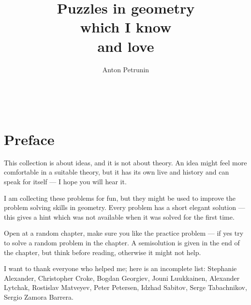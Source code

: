 \documentclass[twoside]{book}
\begin{document}
\title{Puzzles in geometry \\
which I know \\ and love}
\author{Anton Petrunin}

\date{}
\maketitle

\null\vfill{}

\ 

\thispagestyle{empty}
\thispagestyle{empty}
\tableofcontents
\thispagestyle{empty}

\newpage
\thispagestyle{empty}
\section*{Preface}

This collection is about ideas, and it is not about theory.
An idea might feel more comfortable in a suitable theory,
but it has its own live and history and can speak for itself --- I hope you will hear it.

I am collecting these problems for fun, 
but they might be used to improve 
the problem solving skills in geometry.
Every problem has a short elegant solution ---
this gives a hint which was not available
when it was solved for the first time.

Open at a random chapter, make sure you like the practice problem --- if yes try to solve a random problem in the chapter.
A semisolution is given in the end of the chapter,
but think before reading,
otherwise it might not help. 

I want to thank everyone who helped me;
here is an incomplete list:
Stephanie Alexander,
Christopher Croke,
Bogdan Georgiev,
Jouni Luukkainen,
Alexander Lytchak,
Rostislav Matveyev, 
Peter Petersen, 
Idzhad Sabitov,
Serge Tabachnikov,
Sergio Zamora Barrera.
\end{document}
